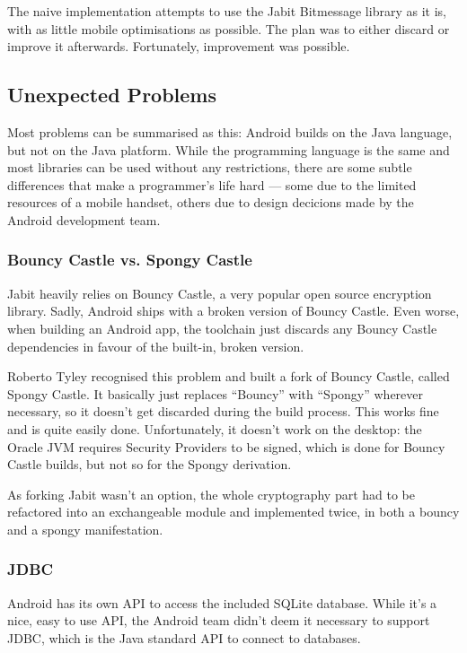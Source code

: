 \documentclass{bfh}
\begin{document}
  The naive implementation attempts to use the Jabit Bitmessage library as it is, with as little mobile optimisations as possible. The plan was to either discard or improve it afterwards. Fortunately, improvement was possible.

  \subsection{Unexpected Problems}
  Most problems can be summarised as this: Android builds on the Java language, but not on the Java platform. While the programming language is the same and most libraries can be used without any restrictions, there are some subtle differences that make a programmer's life hard --- some due to the limited resources of a mobile handset, others due to design decicions made by the Android development team.
  
  \subsubsection{Bouncy Castle vs. Spongy Castle}
  \label{subsec:bcvssc}
  Jabit heavily relies on Bouncy Castle, a very popular open source encryption library.\cite{bouncy} Sadly, Android ships with a broken version of Bouncy Castle. Even worse, when building an Android app, the toolchain just discards any Bouncy Castle dependencies in favour of the built-in, broken version.

  Roberto Tyley recognised this problem and built a fork of Bouncy Castle, called Spongy Castle.\cite{spongy} It basically just replaces “Bouncy” with “Spongy” wherever necessary, so it doesn’t get discarded during the build process. This works fine and is quite easily done. Unfortunately, it doesn’t work on the desktop: the Oracle JVM requires Security Providers to be signed, which is done for Bouncy Castle builds, but not so for the Spongy derivation.

  As forking Jabit wasn’t an option, the whole cryptography part had to be refactored into an exchangeable module and implemented twice, in both a bouncy and a spongy manifestation.

  \subsubsection{JDBC}
  \label{subsec:jdbc}
  Android has its own \ac{API} to access the included SQLite database. While it’s a nice, easy to use \ac{API}, the Android team didn’t deem it necessary to support \acs{JDBC}, which is the Java standard API to connect to databases.
\end{document}
